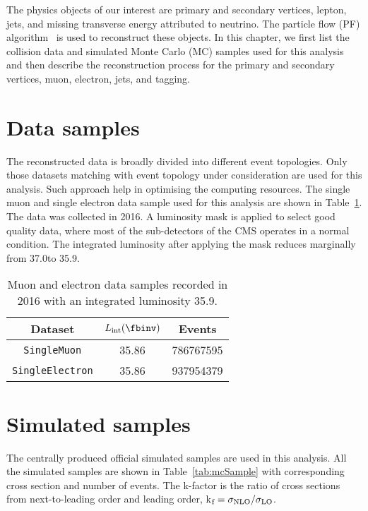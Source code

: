 The physics objects of our interest are primary and secondary vertices, 
lepton, jets, and missing transverse energy attributed to neutrino. The particle flow (PF) 
algorithm~\cite{CMS-PAS-PFT-09-001,CMS-PAS-PFT-10-001} is used to 
reconstruct these objects. In this chapter, we first list the collision data 
and simulated Monte Carlo (MC) samples used for this analysis and then describe the 
reconstruction process for the primary and secondary vertices, muon, electron, jets, and 
\PQb tagging.

\section{Data samples}
The reconstructed data is broadly divided into different event topologies. 
Only those datasets matching with event topology under consideration are used 
for this analysis. Such approach help in optimising the computing resources.
The single muon and single electron data sample used for this analysis are 
shown in Table~\ref{tab:dataSample}. The data was collected in 2016. 
A luminosity mask is applied to select good quality data, where most of the 
sub-detectors of the CMS operates in a normal condition. The integrated luminosity
after applying the mask reduces marginally from 37.0\fbinv to 35.9\fbinv.

\begin{table}
\begin{center}
\caption{Muon and electron data samples recorded in 2016 with an integrated 
	luminosity 35.9\fbinv.} 
\label{tab:dataSample}
\begin{tabular}{ccc} \hline\hline                                                         {\bf{Dataset}} & {\bf{$L_{\rm{int}} (\fbinv)$}} & {\bf{Events}} \\\hline\hline
\verb|SingleMuon|    & 35.86 & 786767595  \\[0.1cm]
\verb|SingleElectron|& 35.86 & 937954379 \\\hline
 \end{tabular}          
\end{center}
\end{table}

\section{Simulated samples}
The centrally produced official simulated samples are used in this analysis. 
All the simulated samples  are shown in Table~\ref{tab:mcSample} with 
corresponding cross section and number of events. The k-factor is the 
ratio of cross sections from next-to-leading order and leading order, 
k$_\rm{f} =\sigma_{\text{NLO}}/\sigma_{\text{LO}}$.

